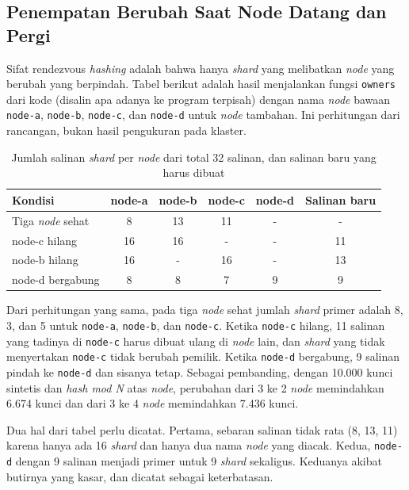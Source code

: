 \subsection{Penempatan Berubah Saat Node Datang dan Pergi}

Sifat rendezvous \textit{hashing} adalah bahwa hanya \textit{shard} yang melibatkan \textit{node} yang berubah yang berpindah. Tabel berikut adalah hasil menjalankan fungsi \texttt{owners} dari kode (disalin apa adanya ke program terpisah) dengan nama \textit{node} bawaan \texttt{node-a}, \texttt{node-b}, \texttt{node-c}, dan \texttt{node-d} untuk \textit{node} tambahan. Ini perhitungan dari rancangan, bukan hasil pengukuran pada klaster.

\begin{table}[H]
\centering
\caption{Jumlah salinan \textit{shard} per \textit{node} dari total 32 salinan, dan salinan baru yang harus dibuat}
\begin{tabular}{|l|c|c|c|c|c|}
\hline
\rowcolor{gray!25}
\textbf{Kondisi} & \textbf{node-a} & \textbf{node-b} & \textbf{node-c} & \textbf{node-d} & \textbf{Salinan baru} \\
\hline
Tiga \textit{node} sehat & 8 & 13 & 11 & - & - \\
\hline
node-c hilang & 16 & 16 & - & - & 11 \\
\hline
node-b hilang & 16 & - & 16 & - & 13 \\
\hline
node-d bergabung & 8 & 8 & 7 & 9 & 9 \\
\hline
\end{tabular}
\vspace{-12pt}
\end{table}

Dari perhitungan yang sama, pada tiga \textit{node} sehat jumlah \textit{shard} primer adalah 8, 3, dan 5 untuk \texttt{node-a}, \texttt{node-b}, dan \texttt{node-c}. Ketika \texttt{node-c} hilang, 11 salinan yang tadinya di \texttt{node-c} harus dibuat ulang di \textit{node} lain, dan \textit{shard} yang tidak menyertakan \texttt{node-c} tidak berubah pemilik. Ketika \texttt{node-d} bergabung, 9 salinan pindah ke \texttt{node-d} dan sisanya tetap. Sebagai pembanding, dengan 10.000 kunci sintetis dan \textit{hash mod N} atas \textit{node}, perubahan dari 3 ke 2 \textit{node} memindahkan 6.674 kunci dan dari 3 ke 4 \textit{node} memindahkan 7.436 kunci.

Dua hal dari tabel perlu dicatat. Pertama, sebaran salinan tidak rata (8, 13, 11) karena hanya ada 16 \textit{shard} dan hanya dua nama \textit{node} yang diacak. Kedua, \texttt{node-d} dengan 9 salinan menjadi primer untuk 9 \textit{shard} sekaligus. Keduanya akibat butirnya yang kasar, dan dicatat sebagai keterbatasan.

